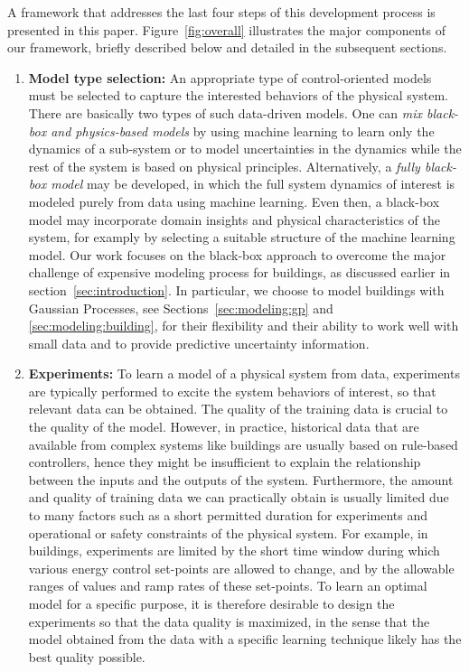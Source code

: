 A framework that addresses the last four steps of this development process is presented in this paper.
Figure~\ref{fig:overall} illustrates the major components of our framework, briefly described below and detailed in the subsequent sections.
\begin{enumerate}
\item \textbf{Model type selection:} An appropriate type of control-oriented models must be selected to capture the interested behaviors of the physical system.
  There are basically two types of such data-driven models.  One can \emph{mix black-box and physics-based models} by using machine learning to learn only the dynamics of a sub-system or to model uncertainties in the dynamics while the rest of the system is based on physical principles.
  Alternatively, a \emph{fully black-box model} may be developed, in which the full system dynamics of interest is modeled purely from data using machine learning.  Even then, a black-box model may incorporate domain insights and physical characteristics of the system, for examply by selecting a suitable structure of the machine learning model.
  Our work focuses on the black-box approach to overcome the major challenge of expensive modeling process for buildings, as discussed earlier in section~\ref{sec:introduction}.
  In particular, we choose to model buildings with Gaussian Processes, see Sections~\ref{sec:modeling:gp} and \ref{sec:modeling:building}, for their flexibility and their ability to work well with small data and to provide predictive uncertainty information.
\item \textbf{Experiments:} To learn a model of a physical system from data, experiments are typically performed to excite the system behaviors of interest, so that relevant data can be obtained.
  The quality of the training data is crucial to the quality of the model. 
  However, in practice, historical data that are available from complex systems like buildings are usually based on rule-based controllers, hence they might be insufficient to explain the relationship between the inputs and the outputs of the system.
  Furthermore, the amount and quality of training data we can practically obtain is usually limited due to many factors such as a short permitted duration for experiments and operational or safety constraints of the physical system.
  For example, in buildings, experiments are limited by the short time window during which various energy control set-points are allowed to change, and by the allowable ranges of values and ramp rates of these set-points.
  To learn an optimal model for a specific purpose, it is therefore desirable to design the experiments so that the data quality is maximized, in the sense that the model obtained from the data with a specific learning technique likely has the best quality possible.

\end{enumerate}
